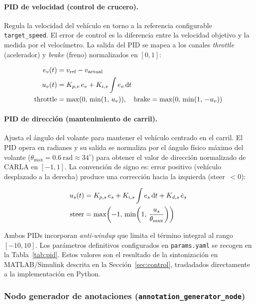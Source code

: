 \documentclass[12pt, a4paper]{article}
\begin{document}
\paragraph{PID de velocidad (control de crucero).}
Regula la velocidad del vehículo en torno a la referencia configurable \texttt{target\_speed}. El error de control es la diferencia entre la velocidad objetivo y la medida por el velocímetro. La salida del PID se mapea a los canales \textit{throttle} (acelerador) y \textit{brake} (freno) normalizados en $[0, 1]$:

\begin{align}
    e_v(t) &= v_{\text{ref}} - v_{\text{actual}} \notag \\
    u_v(t) &= K_{p,v}\,e_v + K_{i,v}\int e_v\,\mathrm{d}t \notag \\
    \text{throttle} &= \max(0,\,\min(1,\, u_v)), \quad
    \text{brake} = \max(0,\,\min(1,\,-u_v)) \notag
\end{align}

\paragraph{PID de dirección (mantenimiento de carril).}
Ajusta el ángulo del volante para mantener el vehículo centrado en el carril. El PID opera en radianes y su salida se normaliza por el ángulo físico máximo del volante ($\theta_{\max} = 0.6~\text{rad} \approx 34^\circ$) para obtener el valor de dirección normalizado de CARLA en $[-1,1]$. La convención de signo es: error positivo (vehículo desplazado a la derecha) produce una corrección hacia la izquierda (steer~$< 0$):

\begin{align}
    u_s(t) &= K_{p,s}\,e_s + K_{i,s}\int e_s\,\mathrm{d}t + K_{d,s}\,\dot{e}_s \notag \\
    \text{steer} &= \max\!\left(-1,\,\min\!\left(1,\,\frac{u_s}{\theta_{\max}}\right)\right) \notag
\end{align}

Ambos PIDs incorporan \textit{anti-windup} que limita el término integral al rango $[-10, 10]$. Los parámetros definitivos configurados en \texttt{params.yaml} se recogen en la Tabla~\ref{tab:pid}. Estos valores son el resultado de la sintonización en MATLAB/Simulink descrita en la Sección~\ref{sec:control}, trasladados directamente a la implementación en Python.

\subsubsection{Nodo generador de anotaciones (\texttt{annotation\_generator\_node})}
\end{document}
